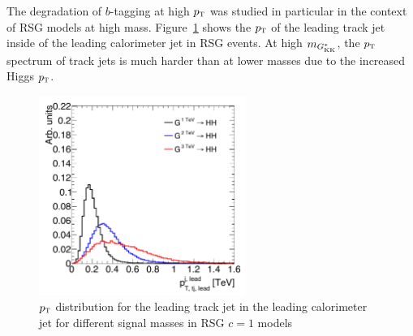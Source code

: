 The degradation of $b$-tagging at high $p_{\textrm{\footnotesize\sc t}}$ was studied in particular in the context of RSG models at high mass. Figure~\ref{fig:TrackJetPt} shows the $p_{\textrm{\footnotesize\sc t}}$ of the leading track jet inside of the leading calorimeter jet in RSG events. At high $m_{G^*_{\rm KK}}$, the $p_{\textrm{\footnotesize\sc t}}$ spectrum of track jets is much harder than at lower masses due to the increased Higgs $p_{\textrm{\footnotesize\sc t}}$. 

\begin{figure}[h!]
  \centering
  \captionsetup{justification=centering}

  \includegraphics[width=0.6\textwidth]{figures/TrackJetPt}
  \caption{$p_{\textrm{\footnotesize\sc t}}$ distribution for the leading track jet in the leading calorimeter jet for different signal masses in RSG $c=1$ models}
  \label{fig:TrackJetPt}
\end{figure}